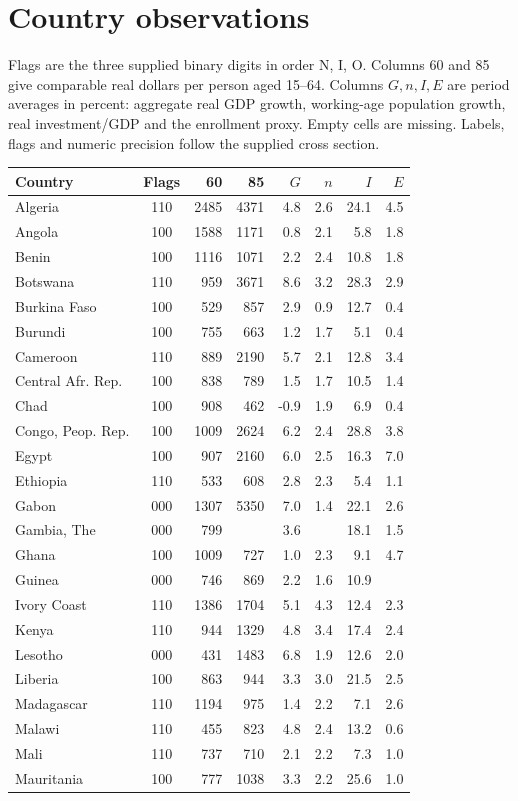 \documentclass[11pt]{article}
\begin{document}
\section{Country observations}
Flags are the three supplied binary digits in order N, I, O. Columns 60 and 85 give comparable real dollars per person aged 15--64. Columns $G,n,I,E$ are period averages in percent: aggregate real GDP growth, working-age population growth, real investment/GDP and the enrollment proxy. Empty cells are missing. Labels, flags and numeric precision follow the supplied cross section.
\small
\begin{longtable}{lcrrrrrr}
\toprule Country&Flags&60&85&$G$&$n$&$I$&$E$\\\midrule\endhead
Algeria&110&2485&4371&4.8&2.6&24.1&4.5\\
Angola&100&1588&1171&0.8&2.1&5.8&1.8\\
Benin&100&1116&1071&2.2&2.4&10.8&1.8\\
Botswana&110&959&3671&8.6&3.2&28.3&2.9\\
Burkina Faso&100&529&857&2.9&0.9&12.7&0.4\\
Burundi&100&755&663&1.2&1.7&5.1&0.4\\
Cameroon&110&889&2190&5.7&2.1&12.8&3.4\\
Central Afr. Rep.&100&838&789&1.5&1.7&10.5&1.4\\
Chad&100&908&462&-0.9&1.9&6.9&0.4\\
Congo, Peop. Rep.&100&1009&2624&6.2&2.4&28.8&3.8\\
Egypt&100&907&2160&6.0&2.5&16.3&7.0\\
Ethiopia&110&533&608&2.8&2.3&5.4&1.1\\
Gabon&000&1307&5350&7.0&1.4&22.1&2.6\\
Gambia, The&000&799&&3.6&&18.1&1.5\\
Ghana&100&1009&727&1.0&2.3&9.1&4.7\\
Guinea&000&746&869&2.2&1.6&10.9&\\
Ivory Coast&110&1386&1704&5.1&4.3&12.4&2.3\\
Kenya&110&944&1329&4.8&3.4&17.4&2.4\\
Lesotho&000&431&1483&6.8&1.9&12.6&2.0\\
Liberia&100&863&944&3.3&3.0&21.5&2.5\\
Madagascar&110&1194&975&1.4&2.2&7.1&2.6\\
Malawi&110&455&823&4.8&2.4&13.2&0.6\\
Mali&110&737&710&2.1&2.2&7.3&1.0\\
Mauritania&100&777&1038&3.3&2.2&25.6&1.0\\

\end{longtable}
\end{document}
